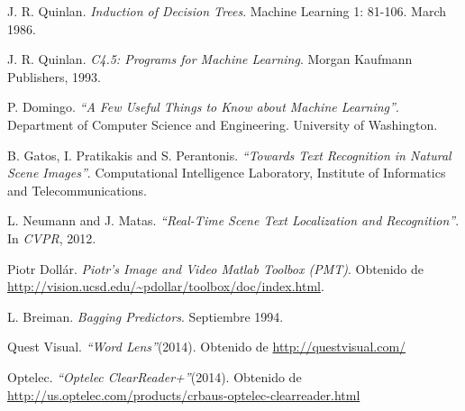 \begin{thebibliography}{100}
		J. R. Quinlan.
		\emph{Induction of Decision Trees}.
		Machine Learning 1: 81-106.
		March 1986.
		
		J. R. Quinlan.
		\emph{C4.5: Programs for Machine Learning}.
		Morgan Kaufmann Publishers, 1993.
		
		P. Domingo.
		\emph{``A Few Useful Things to Know about Machine Learning''}.
		Department of Computer Science and Engineering.
		University of Washington.
		
		B. Gatos, I. Pratikakis and S. Perantonis.
		\emph{``Towards Text Recognition in Natural Scene Images''}.
		Computational Intelligence Laboratory, Institute of Informatics and Telecommunications.
		
		L. Neumann and J. Matas.
		\emph{``Real-Time Scene Text Localization and Recognition''}.
		In \textit{CVPR}, 2012.
		
		Piotr Dollár.
		\emph{Piotr's Image and Video Matlab Toolbox (PMT)}.
		Obtenido de \url{http://vision.ucsd.edu/~pdollar/toolbox/doc/index.html}. 
		
		L. Breiman.
		\emph{Bagging Predictors}.
		Septiembre 1994.
		
		Quest Visual.
		\emph{``Word Lens''}(2014).
		Obtenido de \url{http://questvisual.com/}

		Optelec.
		\emph{``Optelec ClearReader+''}(2014).
		Obtenido de \url{http://us.optelec.com/products/crbaus-optelec-clearreader.html}	
				
\end{thebibliography}